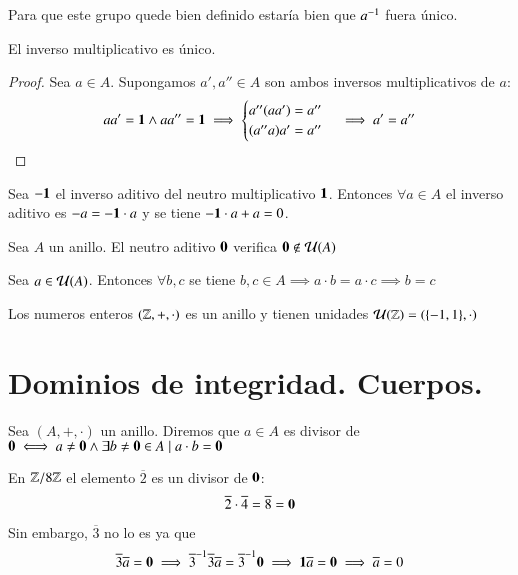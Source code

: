 Para que este grupo quede bien definido estaría bien que $a^{-1}$ fuera único.

\begin{pro}
	El inverso multiplicativo es único.
\end{pro}

\begin{proof}
	Sea $a \in A$. Supongamos $a', a'' \in A$ son ambos inversos multiplicativos de $a$:
	\begin{align*}
		aa' = \mathbf{1} \land aa'' = \mathbf{1}\implies \begin{cases}
		a''(aa') = a'' \\
		(a''a)a' = a''
		\end{cases}\implies a' = a''
	\end{align*}
\end{proof}

\begin{pro}
	Sea $-\mathbf{1}$ el inverso aditivo del neutro multiplicativo $\mathbf{1}$. Entonces $\forall a \in A$ el inverso aditivo es $-a = -\mathbf{1} \cdot a$ y se tiene $-\mathbf{1}\cdot a + a = 0$.
\end{pro}

\begin{pro}
	Sea $A$ un anillo. El neutro aditivo $\mathbf{0}$ verifica $\mathbf{0} \not\in \mathcal{U}(A)$
\end{pro}

\begin{pro}
	Sea $a \in \mathcal{U}(A)$. Entonces $\forall b,c$ se tiene $b, c \in A \implies a\cdot b = a\cdot c \implies b = c$
\end{pro}

\begin{ej}
	Los numeros enteros $(\mathbb{Z}, +, \cdot)$ es un anillo y tienen unidades $\mathcal{U}(\mathbb{Z}) = (\{-1, 1\}, \cdot)$
\end{ej}


\section{Dominios de integridad. Cuerpos.}

\begin{dfn}[Divisor de 0]
	Sea $(A, +, \cdot)$ un anillo. Diremos que $a \in A$ es divisor de $\mathbf{0} \iff a \neq \mathbf{0} \land \exists b \neq \mathbf{0} \in A \mid a\cdot b = \mathbf{0}$
\end{dfn}

\begin{ej}
	En $\mathbb{Z}/8\mathbb{Z}$ el elemento $\overline{2}$ es un divisor de $\mathbf{0}$:
	\begin{align*}
		\overline{2}\cdot\overline{4} = \overline{8} = \mathbf{0}
	\end{align*}
	Sin embargo, $\overline{3}$ no lo es ya que
	\begin{align*}
		\overline{3}\overline{a} = \mathbf{0} \implies \overline{3}^{-1}\overline{3}\overline{a} = \overline{3}^{-1}\mathbf{0} \implies \mathbf{1} \overline{a} = \mathbf{0} \implies \overline{a} = 0
	\end{align*}
\end{ej}

